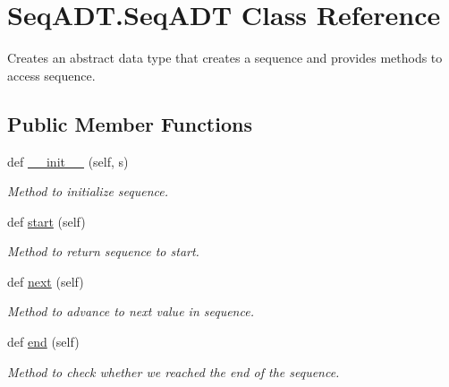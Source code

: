 \hypertarget{class_seq_a_d_t_1_1_seq_a_d_t}{}\section{Seq\+A\+D\+T.\+Seq\+A\+DT Class Reference}
\label{class_seq_a_d_t_1_1_seq_a_d_t}


Creates an abstract data type that creates a sequence and provides methods to access sequence.  


\subsection*{Public Member Functions}
\begin{DoxyCompactItemize}
\item 
def \mbox{\hyperlink{class_seq_a_d_t_1_1_seq_a_d_t_a274f6f35c4d7221955ff721ab88b12e1}{\+\_\+\+\_\+init\+\_\+\+\_\+}} (self, s)
\begin{DoxyCompactList}\small\item\em Method to initialize sequence. \end{DoxyCompactList}\item 
\mbox{\label{class_seq_a_d_t_1_1_seq_a_d_t_ad89d5ccf139e928a65000f00e605692e}} 
def \mbox{\hyperlink{class_seq_a_d_t_1_1_seq_a_d_t_ad89d5ccf139e928a65000f00e605692e}{start}} (self)
\begin{DoxyCompactList}\small\item\em Method to return sequence to start. \end{DoxyCompactList}\item 
def \mbox{\hyperlink{class_seq_a_d_t_1_1_seq_a_d_t_a1d2ee97ccd784507ae32c00150dc6fb0}{next}} (self)
\begin{DoxyCompactList}\small\item\em Method to advance to next value in sequence. \end{DoxyCompactList}\item 
def \mbox{\hyperlink{class_seq_a_d_t_1_1_seq_a_d_t_a7d8df17dae5df548ca32054075ca04b8}{end}} (self)
\begin{DoxyCompactList}\small\item\em Method to check whether we reached the end of the sequence. \end{DoxyCompactList}\end{DoxyCompactItemize}
